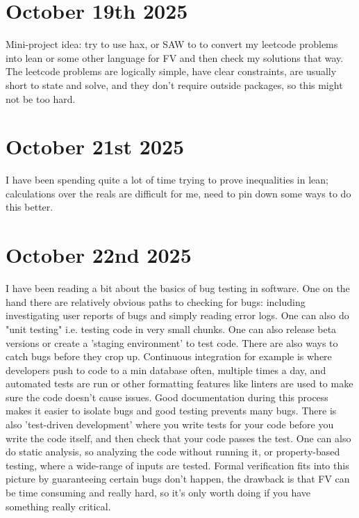 \documentclass{amsart}
\theoremstyle{definition}
\begin{document}
\section{October 19th 2025}

Mini-project idea: try to use hax, or SAW to to convert my leetcode problems into lean or some other language for FV and then check my solutions that way. The leetcode problems are logically simple, have clear constraints, are usually short to state and solve, and they don't require outside packages, so this might not be too hard.

\section{October 21st 2025}

I have been spending quite a lot of time trying to prove inequalities in lean; calculations over the reals are difficult for me, need to pin down some ways to do this better.

\section{October 22nd 2025}

I have been reading a bit about the basics of bug testing in software. One on the hand there are relatively obvious paths to checking for bugs: including investigating user reports of bugs and simply reading error logs. One can also do "unit testing" i.e. testing code in very small chunks. One can also release beta versions or create a 'staging environment' to test code. There are also ways to catch bugs before they crop up. Continuous integration for example is where developers push to code to a min database often, multiple times a day, and automated tests are run or other formatting features like linters are used to make sure the code doesn't cause issues. Good documentation during this process makes it easier to isolate bugs and good testing prevents many bugs. There is also 'test-driven development' where you write tests for your code before you write the code itself, and then check that your code passes the test. One can also do static analysis, so analyzing the code without running it, or property-based testing, where a wide-range of inputs are tested.
Formal verification fits into this picture by guaranteeing certain bugs don't happen, the drawback is that FV can be time consuming and really hard, so it's only worth doing if you have something really critical.
\end{document}
